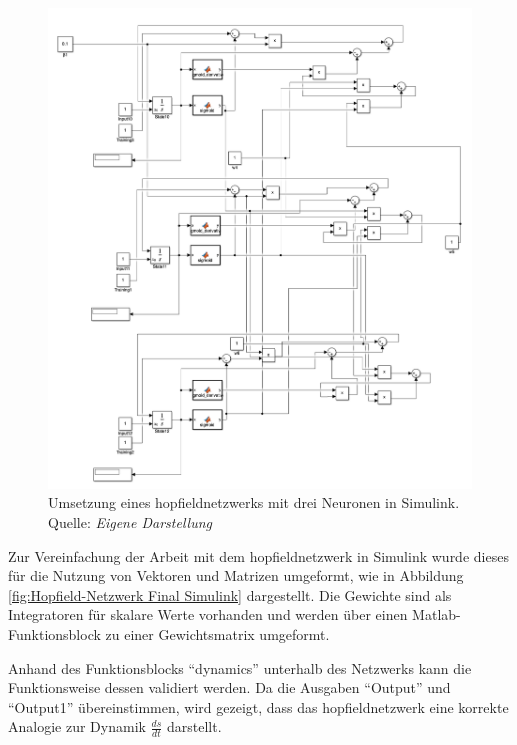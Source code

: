 \begin{figure}[h]
  \includegraphics[width=\textwidth]{abbildungen/hnn_without_bias_with_cost_3_neurons_simulink.png}
  \caption{Umsetzung eines \gls{hopfieldnetzwerk}s mit drei Neuronen in Simulink. Quelle: \textit{Eigene Darstellung}}
  \label{fig:Hopfield-Netzwerk 3 Neuronen Simulink}
\end{figure}

Zur Vereinfachung der Arbeit mit dem \gls{hopfieldnetzwerk} in Simulink wurde dieses für die Nutzung von Vektoren und Matrizen umgeformt, wie in Abbildung \ref{fig:Hopfield-Netzwerk Final Simulink} dargestellt. Die Gewichte sind als Integratoren für skalare Werte vorhanden und werden über einen Matlab-Funktionsblock zu einer Gewichtsmatrix umgeformt.

Anhand des Funktionsblocks "`dynamics"' unterhalb des Netzwerks kann die Funktionsweise dessen validiert werden. Da die Ausgaben "`Output"' und "`Output1"' übereinstimmen, wird gezeigt, dass das \gls{hopfieldnetzwerk} eine korrekte Analogie zur Dynamik \(\frac{ds}{dt}\) darstellt.


